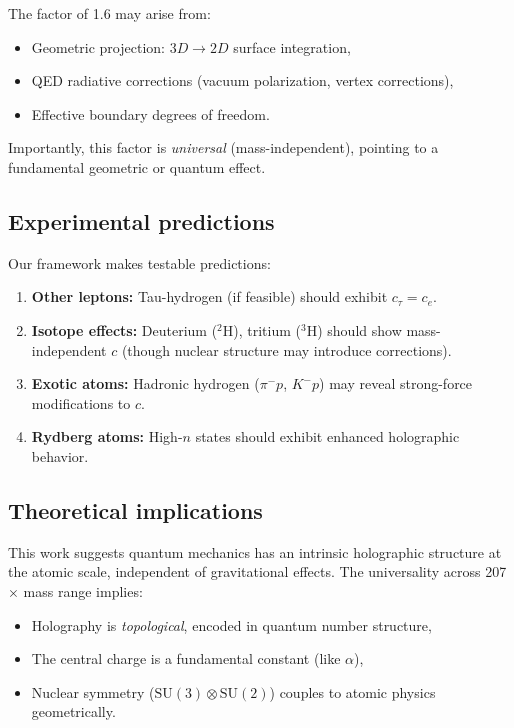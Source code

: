 \documentclass[aps,prl,twocolumn,showpacs,superscriptaddress,groupedaddress]{revtex4-2}
\begin{document}
The factor of 1.6 may arise from:
\begin{itemize}
\item Geometric projection: $3D \to 2D$ surface integration,
\item QED radiative corrections (vacuum polarization, vertex corrections),
\item Effective boundary degrees of freedom.
\end{itemize}

Importantly, this factor is \emph{universal} (mass-independent), pointing to a fundamental geometric or quantum effect.

\subsection{Experimental predictions}

Our framework makes testable predictions:
\begin{enumerate}
\item \textbf{Other leptons:} Tau-hydrogen (if feasible) should exhibit $c_\tau = c_e$.
\item \textbf{Isotope effects:} Deuterium ($^2$H), tritium ($^3$H) should show mass-independent $c$ (though nuclear structure may introduce corrections).
\item \textbf{Exotic atoms:} Hadronic hydrogen ($\pi^- p$, $K^- p$) may reveal strong-force modifications to $c$.
\item \textbf{Rydberg atoms:} High-$n$ states should exhibit enhanced holographic behavior.
\end{enumerate}

\subsection{Theoretical implications}

This work suggests quantum mechanics has an intrinsic holographic structure at the atomic scale, independent of gravitational effects. The universality across 207$\times$ mass range implies:
\begin{itemize}
\item Holography is \emph{topological}, encoded in quantum number structure,
\item The central charge is a fundamental constant (like $\alpha$),
\item Nuclear symmetry ($\text{SU}(3) \otimes \text{SU}(2)$) couples to atomic physics geometrically.
\end{itemize}
\end{document}
